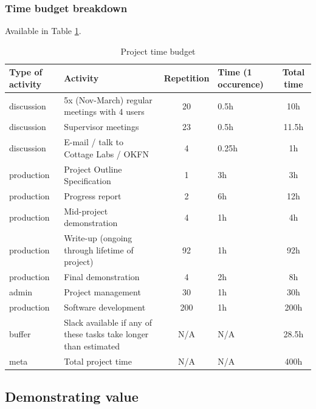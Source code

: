 \documentclass[11pt,fleqn,twoside]{article}
\begin{document}
\subsubsection{Time budget breakdown}
\label{time-budget}
Available in Table \ref{tab:time-breakdown}.

\begin{table}[H]
\centering
\begin{tabular}{p{2cm}|p{6cm}|c|>{\centering}p{2cm}<{\centering}|c}
	Type of activity & Activity & Repetition & Time (1 occurence) & Total time \\
	\hline
	discussion & 5x (Nov-March) regular meetings with 4 users & 20 & 0.5h & 10h \\[3pt]
	discussion & Supervisor meetings & 23 & 0.5h & 11.5h \\[3pt]
	discussion & E-mail / talk to Cottage Labs / OKFN & 4 & 0.25h & 1h \\[3pt]
	production & Project Outline Specification & 1 & 3h & 3h \\[3pt]
	production & Progress report & 2 & 6h & 12h \\[3pt]
	production & Mid-project demonstration & 4 & 1h & 4h \\[3pt]
	production & Write-up (ongoing through lifetime of project) & 92 & 1h & 92h \\[3pt]
	production & Final demonstration & 4 & 2h & 8h \\[3pt]
	admin & Project management & 30 & 1h & 30h \\[3pt]
	production & Software development & 200 & 1h & 200h \\[3pt]
	buffer & Slack available if any of these tasks take longer than estimated & N/A & N/A & 28.5h \\[3pt]
	\hline
	meta & Total project time & N/A & N/A & 400h \\
\end{tabular}
\caption{Project time budget}
\label{tab:time-breakdown}
\end{table}

\subsection{Demonstrating value}

\end{document}
